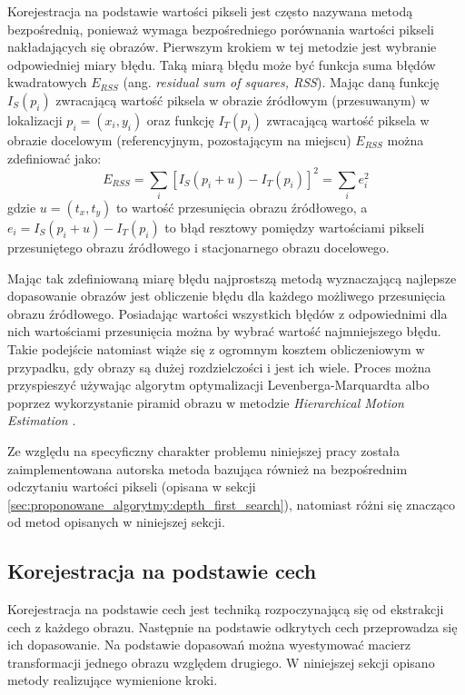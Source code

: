 Korejestracja na podstawie wartości pikseli jest często nazywana metodą bezpośrednią, ponieważ wymaga bezpośredniego porównania wartości pikseli nakładających się obrazów. Pierwszym krokiem w tej metodzie jest wybranie odpowiedniej miary błędu. Taką miarą błędu może być funkcja suma błędów kwadratowych $E_{RSS}$ (ang. \textit{residual sum of squares, RSS}). Mając daną funkcję $I_{S}(p_{i})$ zwracającą wartość piksela w obrazie źródłowym (przesuwanym) w lokalizacji $p_{i}=(x_{i}, y_{i})$ oraz funkcję $I_{T}(p_{i})$ zwracającą wartość piksela w obrazie docelowym (referencyjnym, pozostającym na miejscu) $E_{RSS}$ można zdefiniować jako:
\begin{equation}
E_{RSS}=\sum_{i}[I_{S}(p_{i}+u)-I_{T}(p_{i})]^2=\sum_{i}e_{i}^2
\end{equation}
gdzie $u=(t_{x}, t_{y})$ to wartość przesunięcia obrazu źródłowego, a $e_{i}=I_{S}(p_{i}+u)-I_{T}(p_{i})$ to błąd resztowy pomiędzy wartościami pikseli przesuniętego obrazu źródłowego i stacjonarnego obrazu docelowego.

Mając tak zdefiniowaną miarę błędu najprostszą metodą wyznaczającą najlepsze dopasowanie obrazów jest obliczenie błędu dla każdego możliwego przesunięcia obrazu źródłowego. Posiadając wartości wszystkich błędów z odpowiednimi dla nich wartościami przesunięcia można by wybrać wartość najmniejszego błędu. Takie podejście natomiast wiąże się z ogromnym kosztem obliczeniowym w przypadku, gdy obrazy są dużej rozdzielczości i jest ich wiele. Proces można przyspieszyć używając algorytm optymalizacji Levenberga-Marquardta \cite{unser:07} albo poprzez wykorzystanie piramid obrazu w metodzie \textit{Hierarchical Motion Estimation} \cite{export:70092}.

Ze względu na specyficzny charakter problemu niniejszej pracy została zaimplementowana autorska metoda bazująca również na bezpośrednim odczytaniu wartości pikseli (opisana w sekcji \ref{sec:proponowane_algorytmy:depth_first_search}), natomiast różni się znacząco od metod opisanych w niniejszej sekcji.

\subsection{Korejestracja na podstawie cech}
\label{sec:algorytmy_korejestracji:korejestracja_na_podstawie_cech}

Korejestracja na podstawie cech jest techniką rozpoczynającą się od ekstrakcji cech z każdego obrazu. Następnie na podstawie odkrytych cech przeprowadza się ich dopasowanie. Na podstawie dopasowań można wyestymować macierz transformacji jednego obrazu względem drugiego. W niniejszej sekcji opisano metody realizujące wymienione kroki.

